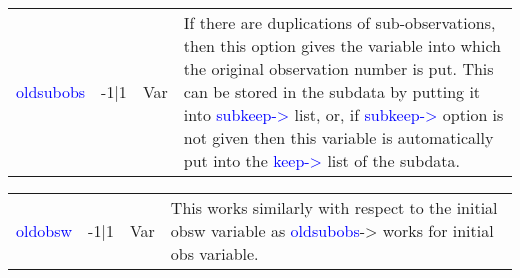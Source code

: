\vspace{-1.51em}
\begin{table}[H]
\begin{tabular}{ m{}  m{}m{}p{}}
 \textcolor{blue}{oldsubobs}&-1|1& Var& If there are duplications of sub-observations, then this option gives the variable
 into which the original observation number is put. This can be stored in the
 subdata by putting it into \textcolor{blue}{subkeep->} list, or, if \textcolor{blue}{subkeep->} option is not given
 then this variable is automatically put into the \textcolor{blue}{keep->} list of the subdata.

\\ \cline{1-4}
\end{tabular}
\end{table}
\vspace{-1.51em}
\begin{table}[H]
\begin{tabular}{ m{}  m{}m{}p{}}
 \textcolor{blue}{oldobsw}&-1|1&Var& This works similarly with respect to the initial obsw variable as \textcolor{blue}{oldsubobs}->
 works for initial obs variable.

\\ \cline{1-4}
\end{tabular}
\end{table}
\vspace{-1.51em}
